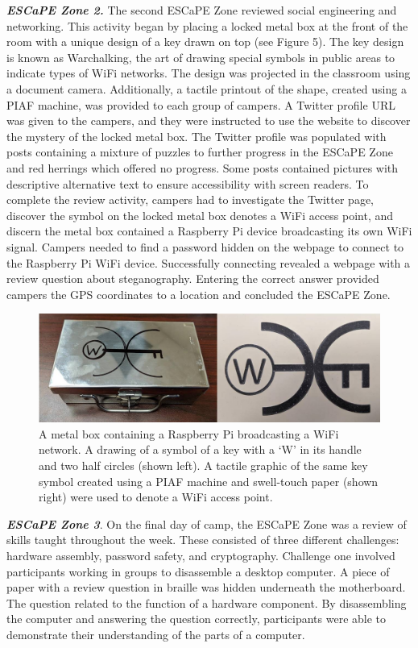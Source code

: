 \documentclass[11.5pt]{sig-alternate} %
\begin{document}
\begin{large}
\textbf{\textit{ESCaPE Zone 2.}} The second ESCaPE Zone reviewed social engineering and networking. This activity began by placing a locked metal box at the front of the room with a unique design of a key drawn on top (see Figure 5). The key design is known as Warchalking, the art of drawing special symbols in public areas to indicate types of WiFi networks. The design was projected in the classroom using a document camera. Additionally, a tactile printout of the shape, created using a PIAF machine, was provided to each group of campers. A Twitter profile URL was given to the campers, and they were instructed to use the website to discover the mystery of the locked metal box. The Twitter profile was populated with posts containing a mixture of puzzles to further progress in the ESCaPE Zone and red herrings which offered no progress. Some posts contained pictures with descriptive alternative text to ensure accessibility with screen readers. To complete the review activity, campers had to investigate the Twitter page, discover the symbol on the locked metal box denotes a WiFi access point, and discern the metal box contained a Raspberry Pi device broadcasting its own WiFi signal. Campers needed to find a password hidden on the webpage to connect to the Raspberry Pi WiFi device. Successfully connecting revealed a webpage with a review question about steganography. Entering the correct answer provided campers the GPS coordinates to a location and concluded the ESCaPE Zone.

\begin{figure}[ht]
    \centering
    \includegraphics[width=1\linewidth]{1117_Fig5.jpg}
    \caption{A metal box containing a Raspberry Pi broadcasting a WiFi network. A drawing of a symbol of a key with a ‘W’ in its handle and two half circles (shown left). A tactile graphic of the same key symbol created using a PIAF machine and swell-touch paper (shown right) were used to denote a WiFi access point.}
\end{figure}

\textbf{\textit{ESCaPE Zone 3}}. On the final day of camp, the ESCaPE Zone was a review of skills taught throughout the week. These consisted of three different challenges: hardware assembly, password safety, and cryptography. Challenge one involved participants working in groups to disassemble a desktop computer. A piece of paper with a review question in braille was hidden underneath the motherboard. The question related to the function of a hardware component. By disassembling the computer and answering the question correctly, participants were able to demonstrate their understanding of the parts of a computer.


\end{large}
\end{document}
